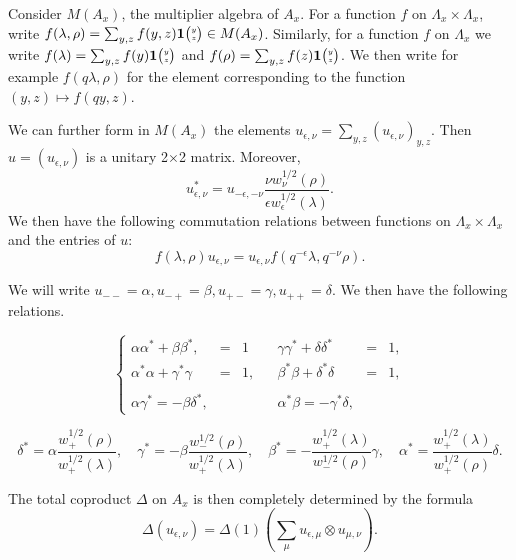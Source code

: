 Consider $M(A_x)$, the multiplier algebra of $A_x$. For a function $f$ on $\Lambda_x\times \Lambda_x$, write $f(\lambda,\rho) = \sum_{y,z} f(y,z)\mathbf{1}{\tiny {\begin{pmatrix} y\\z\end{pmatrix}}} \in M(A_x)$. Similarly, for a function $f$ on $\Lambda_x$ we write $f(\lambda) = \sum_{y,z} f(y)\mathbf{1}{\tiny {\begin{pmatrix} y\\z\end{pmatrix}}}$ and $f(\rho) = \sum_{y,z}f(z)\mathbf{1}{\tiny {\begin{pmatrix} y\\z\end{pmatrix}}}$. We then write for example $f(q\lambda,\rho)$ for the element corresponding to the function $(y,z)\mapsto f(qy,z)$.

We can further form in $M(A_x)$ the elements $u_{\epsilon,\nu} = \sum_{y,z} (u_{\epsilon,\nu})_{y,z}$. Then $u=(u_{\epsilon,\nu})$ is a unitary 2$\times$2 matrix. Moreover, \begin{equation}\label{EqAdju}u_{\epsilon,\nu}^* = u_{-\epsilon,-\nu}\frac{ \nu w_{\nu}^{1/2}(\rho)}{\epsilon w_{\epsilon}^{1/2}(\lambda)}.\end{equation} We then have the following commutation relations between functions on $\Lambda_x\times \Lambda_x$ and the entries of $u$: \begin{equation}\label{EqGradu} f(\lambda,\rho)u_{\epsilon,\nu} = u_{\epsilon,\nu}f(q^{-\epsilon}\lambda,q^{-\nu}\rho).\end{equation}

We will write $u_{--}=\alpha, u_{-+}= \beta, u_{+-}=\gamma,u_{++}=\delta$. We then have the following relations.

\begin{equation}\label{EqId1}\left\{\begin{array}{lllllll} \alpha\alpha^* + \beta\beta^*, &=& 1 &&  \gamma\gamma^* + \delta\delta^* &=& 1,\\ \alpha^*\alpha+ \gamma^*\gamma &=&1,&&\beta^*\beta+ \delta^*\delta &=& 1,\\ \\ \alpha \gamma^* = -\beta \delta^*, &&&& \alpha^*\beta = -\gamma^*\delta, \end{array}\right.\end{equation}

\begin{equation}\label{EqId2} \delta^* = \alpha \frac{w_+^{1/2}(\rho)}{w_+^{1/2}(\lambda)}, \quad \gamma^*=  - \beta\frac{w_{-}^{1/2}(\rho)}{w_+^{1/2}(\lambda)},\quad  \beta^* = - \frac{w_+^{1/2}(\lambda)}{w_{-}^{1/2}(\rho)}\gamma, \quad  \alpha^* =  \frac{w_+^{1/2}(\lambda)}{w_+^{1/2}(\rho)}\delta.\end{equation}

The total coproduct $\Delta$ on $A_x$ is then completely determined by the formula \[\Delta(u_{\epsilon,\nu}) = \Delta(1)\left(\sum_{\mu} u_{\epsilon,\mu}\otimes u_{\mu,\nu}\right).\]

